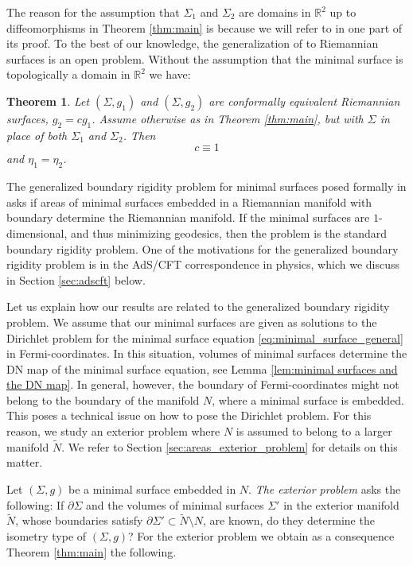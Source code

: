 \documentclass[12pt]{amsart}
\def\p{\partial}
\def\R{\mathbb R}
\newtheorem{theorem}{Theorem}[section]
\theoremstyle{definition}
\theoremstyle{remark}
\newcommand{\tbl}[1]{\textcolor{blue}{#1}}
\newcommand{\f}[1]{\footnote{\tbl{#1}}}
\begin{document}
The reason for the assumption that $\Sigma_1$ and $\Sigma_2$ are domains in $\R^2$ up to diffeomorphisms in Theorem \ref{thm:main} is because we will refer to \cite{imanuvilov2012partial} in one part of its proof. To the best of our knowledge, the generalization of \cite{imanuvilov2012partial} to Riemannian surfaces is an open problem. Without the assumption that the minimal surface is topologically a domain in $\R^2$ we have:
\begin{theorem}\label{thm:main2}
Let $(\Sigma, g_1)$ and $(\Sigma,g_2)$ are conformally equivalent Riemannian surfaces, $g_2=cg_1$. Assume otherwise as in Theorem \ref{thm:main}, but with $\Sigma$ in place of both $\Sigma_1$ and $\Sigma_2$. 
Then 
\[
 c\equiv 1
\]
and $\eta_1=\eta_2$. 
% 
% 
\end{theorem}

The generalized boundary rigidity problem for minimal surfaces posed formally in \cite{Tracey} asks if areas of minimal surfaces embedded in a Riemannian manifold with boundary determine the Riemannian manifold. If the minimal surfaces are $1$-dimensional,
and thus minimizing geodesics, then the problem is the standard boundary rigidity
problem. One of the motivations for the generalized boundary rigidity problem is in
the AdS/CFT correspondence in physics, which we discuss in Section \ref{sec:adscft} below.

Let us explain how our results are related to the generalized boundary rigidity
problem. We assume that our minimal surfaces are given as solutions to the Dirichlet
problem for the minimal surface equation \eqref{eq:minimal_surface_general} in Fermi-coordinates. In this situation,
volumes of minimal surfaces determine the DN map of the minimal surface equation,
see Lemma \ref{lem:minimal surfaces and the DN map}. In general, however, the boundary of Fermi-coordinates might not
belong to the boundary of the manifold $N$, where a minimal surface is embedded. This poses a technical issue on how to pose the Dirichlet problem. For this reason, we study an exterior problem where $N$ is assumed to belong to a larger manifold $\widetilde N$. %
We refer to Section \ref{sec:areas_exterior_problem}
for details on this matter.

Let $(\Sigma,g)$ be a minimal surface embedded in $N$. \emph{The exterior problem} asks the following: If $\p \Sigma$ and the volumes of minimal surfaces $\Sigma'$ in the exterior manifold $\widetilde N$, whose boundaries satisfy $\p \Sigma'\subset \widetilde N\setminus N$, are known, do they determine the isometry type of $(\Sigma,g)$? For the exterior problem we obtain as a consequence Theorem \ref{thm:main} the following.
\end{document}
